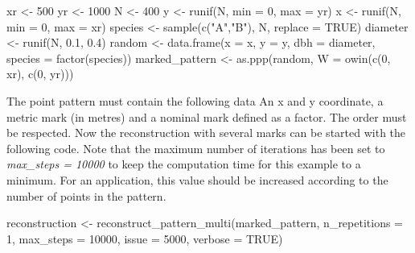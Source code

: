 \documentclass[
  letterpaper,
  DIV=11,
  numbers=noendperiod]{scrreprt}
\newenvironment{Shaded}{\begin{snugshade}}{\end{snugshade}}
\newcommand{\AttributeTok}[1]{\textcolor[rgb]{0.40,0.45,0.13}{#1}}
\newcommand{\ConstantTok}[1]{\textcolor[rgb]{0.56,0.35,0.01}{#1}}
\newcommand{\DecValTok}[1]{\textcolor[rgb]{0.68,0.00,0.00}{#1}}
\newcommand{\FloatTok}[1]{\textcolor[rgb]{0.68,0.00,0.00}{#1}}
\newcommand{\FunctionTok}[1]{\textcolor[rgb]{0.28,0.35,0.67}{#1}}
\newcommand{\NormalTok}[1]{\textcolor[rgb]{0.00,0.23,0.31}{#1}}
\newcommand{\OtherTok}[1]{\textcolor[rgb]{0.00,0.23,0.31}{#1}}
\newcommand{\StringTok}[1]{\textcolor[rgb]{0.13,0.47,0.30}{#1}}
\begin{document}
\begin{Shaded}
\begin{Highlighting}[]
\NormalTok{xr }\OtherTok{\textless{}{-}} \DecValTok{500}
\NormalTok{yr }\OtherTok{\textless{}{-}} \DecValTok{1000}
\NormalTok{N  }\OtherTok{\textless{}{-}} \DecValTok{400}
\NormalTok{y  }\OtherTok{\textless{}{-}} \FunctionTok{runif}\NormalTok{(N, }\AttributeTok{min =} \DecValTok{0}\NormalTok{, }\AttributeTok{max =}\NormalTok{ yr)}
\NormalTok{x  }\OtherTok{\textless{}{-}} \FunctionTok{runif}\NormalTok{(N, }\AttributeTok{min =} \DecValTok{0}\NormalTok{, }\AttributeTok{max =}\NormalTok{ xr)}
\NormalTok{species  }\OtherTok{\textless{}{-}} \FunctionTok{sample}\NormalTok{(}\FunctionTok{c}\NormalTok{(}\StringTok{"A"}\NormalTok{,}\StringTok{"B"}\NormalTok{), N, }\AttributeTok{replace =} \ConstantTok{TRUE}\NormalTok{)}
\NormalTok{diameter }\OtherTok{\textless{}{-}} \FunctionTok{runif}\NormalTok{(N, }\FloatTok{0.1}\NormalTok{, }\FloatTok{0.4}\NormalTok{)}
\NormalTok{random   }\OtherTok{\textless{}{-}} \FunctionTok{data.frame}\NormalTok{(}\AttributeTok{x =}\NormalTok{ x, }\AttributeTok{y =}\NormalTok{ y, }\AttributeTok{dbh =}\NormalTok{ diameter, }\AttributeTok{species =} \FunctionTok{factor}\NormalTok{(species))}
\NormalTok{marked\_pattern }\OtherTok{\textless{}{-}} \FunctionTok{as.ppp}\NormalTok{(random, }\AttributeTok{W =} \FunctionTok{owin}\NormalTok{(}\FunctionTok{c}\NormalTok{(}\DecValTok{0}\NormalTok{, xr), }\FunctionTok{c}\NormalTok{(}\DecValTok{0}\NormalTok{, yr)))}
\end{Highlighting}
\end{Shaded}

The point pattern must contain the following data An x and y coordinate,
a metric mark (in metres) and a nominal mark defined as a factor. The
order must be respected. Now the reconstruction with several marks can
be started with the following code. Note that the maximum number of
iterations has been set to \emph{max\_steps = 10000} to keep the
computation time for this example to a minimum. For an application, this
value should be increased according to the number of points in the
pattern.

\begin{Shaded}
\begin{Highlighting}[]
\NormalTok{reconstruction }\OtherTok{\textless{}{-}} \FunctionTok{reconstruct\_pattern\_multi}\NormalTok{(marked\_pattern, }\AttributeTok{n\_repetitions =} \DecValTok{1}\NormalTok{, }\AttributeTok{max\_steps =} \DecValTok{10000}\NormalTok{, }\AttributeTok{issue =} \DecValTok{5000}\NormalTok{, }\AttributeTok{verbose =} \ConstantTok{TRUE}\NormalTok{)}
\end{Highlighting}
\end{Shaded}
\end{document}
